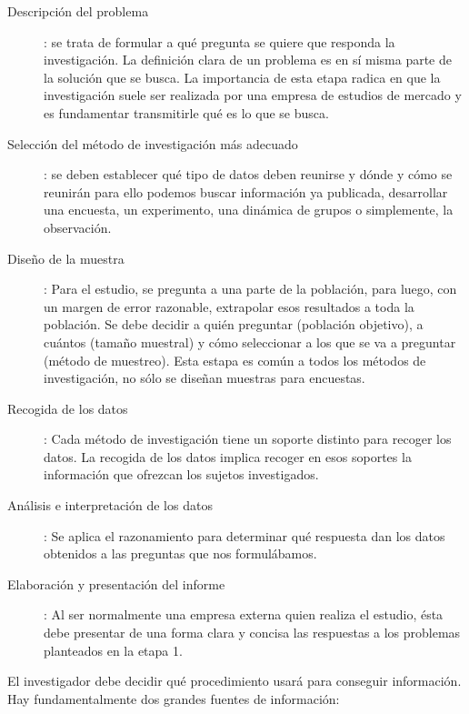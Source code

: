 \documentclass[10pt,a4paper,spanish]{report}
\begin{document}
			\begin{description}
				\item[Descripción del problema]: se trata de formular a qué pregunta se quiere que responda la investigación. La definición clara de un problema es en sí misma parte de la solución que se busca. La importancia de esta etapa radica en que la investigación suele ser realizada por una empresa de estudios de mercado y es fundamentar transmitirle qué es lo que se busca.

				\item[Selección del método de investigación más adecuado]: se deben establecer qué tipo de datos deben reunirse y dónde y cómo se reunirán para ello podemos buscar información ya publicada, desarrollar una encuesta, un experimento, una dinámica de grupos o simplemente, la observación.

				\item[Diseño de la muestra]: Para el estudio, se pregunta a una parte de la población, para luego, con un margen de error razonable, extrapolar esos resultados a toda la población. Se debe decidir a quién preguntar (población objetivo), a cuántos (tamaño muestral) y cómo seleccionar a los que se va a preguntar (método de muestreo). Esta estapa es común a todos los métodos de investigación, no sólo se diseñan muestras para encuestas.

				\item[Recogida de los datos]: Cada método de investigación tiene un soporte distinto para recoger los datos. La recogida de los datos implica recoger en esos soportes la información que ofrezcan los sujetos investigados.

				\item[Análisis e interpretación de los datos]: Se aplica el razonamiento para determinar qué respuesta dan los datos obtenidos a las preguntas que nos formulábamos.

				\item[Elaboración y presentación del informe]: Al ser normalmente una empresa externa quien realiza el estudio, ésta debe presentar de una forma clara y concisa las respuestas a los problemas planteados en la etapa 1.
			\end{description}

			El investigador debe decidir qué procedimiento usará para conseguir información. Hay fundamentalmente dos grandes fuentes de información:
\end{document}
